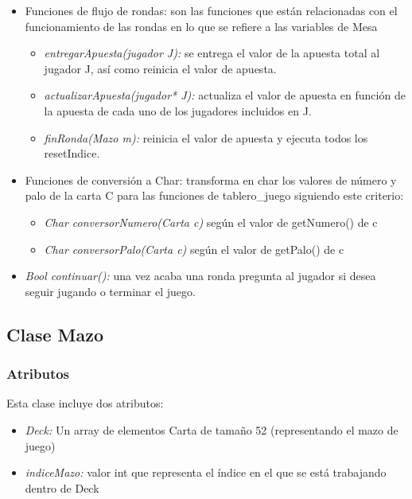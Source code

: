 \begin{itemize}
\begin{itemize}
 \end{itemize}
\item Funciones de flujo de rondas: son las funciones que están relacionadas con el funcionamiento de las rondas en lo que se refiere a las variables de Mesa
\begin{itemize}
\item \textit{entregarApuesta(jugador J):} se entrega el valor de la apuesta total al jugador J, así como reinicia el valor de apuesta.
\item \textit{actualizarApuesta(jugador* J):} actualiza el valor de apuesta en función de la apuesta de cada uno de los jugadores incluidos en J.
\item \textit{finRonda(Mazo m):} reinicia el valor de apuesta y ejecuta todos los resetIndice.
 \end{itemize}
\item Funciones de conversión a Char: transforma en char los valores de número y palo de la carta C para las funciones de tablero\_juego siguiendo este criterio:
\begin{itemize}
\item \textit{Char conversorNumero(Carta c) }según el valor de getNumero() de c
\item \textit{Char conversorPalo(Carta c) }según el valor de getPalo() de c
 \end{itemize}
\item \textit{Bool continuar():} una vez acaba una ronda pregunta al jugador si desea seguir jugando o terminar el juego. 
 \end{itemize}

\subsection{Clase Mazo}
\subsubsection{Atributos}
Esta clase incluye dos atributos:
\begin{itemize}
\item \textit{Deck:} Un array de elementos Carta de tamaño 52 (representando el mazo de juego)
\item\textit{ indiceMazo:} valor int que representa el índice en el que se está trabajando dentro de Deck
\end{itemize}

